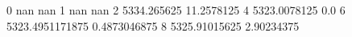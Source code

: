 0 nan nan
1 nan nan
2 5334.265625 11.2578125
4 5323.0078125 0.0
6 5323.4951171875 0.4873046875
8 5325.91015625 2.90234375
